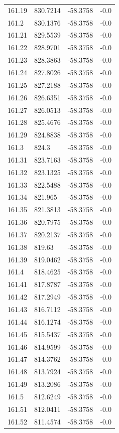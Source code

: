 \begin{table}[H]
\begin{tabular}{llll}
161.19 & 830.7214 & -58.3758 & -0.0 \\
161.2 & 830.1376 & -58.3758 & -0.0 \\
161.21 & 829.5539 & -58.3758 & -0.0 \\
161.22 & 828.9701 & -58.3758 & -0.0 \\
161.23 & 828.3863 & -58.3758 & -0.0 \\
161.24 & 827.8026 & -58.3758 & -0.0 \\
161.25 & 827.2188 & -58.3758 & -0.0 \\
161.26 & 826.6351 & -58.3758 & -0.0 \\
161.27 & 826.0513 & -58.3758 & -0.0 \\
161.28 & 825.4676 & -58.3758 & -0.0 \\
161.29 & 824.8838 & -58.3758 & -0.0 \\
161.3 & 824.3 & -58.3758 & -0.0 \\
161.31 & 823.7163 & -58.3758 & -0.0 \\
161.32 & 823.1325 & -58.3758 & -0.0 \\
161.33 & 822.5488 & -58.3758 & -0.0 \\
161.34 & 821.965 & -58.3758 & -0.0 \\
161.35 & 821.3813 & -58.3758 & -0.0 \\
161.36 & 820.7975 & -58.3758 & -0.0 \\
161.37 & 820.2137 & -58.3758 & -0.0 \\
161.38 & 819.63 & -58.3758 & -0.0 \\
161.39 & 819.0462 & -58.3758 & -0.0 \\
161.4 & 818.4625 & -58.3758 & -0.0 \\
161.41 & 817.8787 & -58.3758 & -0.0 \\
161.42 & 817.2949 & -58.3758 & -0.0 \\
161.43 & 816.7112 & -58.3758 & -0.0 \\
161.44 & 816.1274 & -58.3758 & -0.0 \\
161.45 & 815.5437 & -58.3758 & -0.0 \\
161.46 & 814.9599 & -58.3758 & -0.0 \\
161.47 & 814.3762 & -58.3758 & -0.0 \\
161.48 & 813.7924 & -58.3758 & -0.0 \\
161.49 & 813.2086 & -58.3758 & -0.0 \\
161.5 & 812.6249 & -58.3758 & -0.0 \\
161.51 & 812.0411 & -58.3758 & -0.0 \\
161.52 & 811.4574 & -58.3758 & -0.0 \\

\end{tabular}
\end{table}
